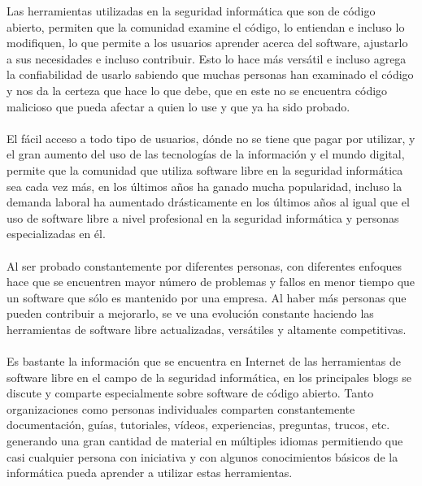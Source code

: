 \begin{multicols}{2}
Las herramientas utilizadas en la seguridad informática que son de código abierto, permiten que la comunidad examine el código, lo entiendan e incluso lo modifiquen, lo que permite a los usuarios aprender acerca del software, ajustarlo a sus necesidades e incluso contribuir. Esto lo hace más versátil e incluso agrega la confiabilidad de usarlo sabiendo que muchas personas han examinado el código y nos da la certeza que hace lo que debe, que en este no se encuentra código malicioso que pueda afectar a quien lo use y que ya ha sido probado.
\\
\\
El fácil acceso a todo tipo de usuarios, dónde no se tiene que pagar por utilizar, y el gran aumento del uso de las tecnologías de la información y el mundo digital, permite que la comunidad que utiliza software libre en la seguridad informática sea cada vez más, en los últimos años ha ganado mucha popularidad, incluso la demanda laboral ha aumentado drásticamente en los últimos años al igual que el uso de software libre a nivel profesional en la seguridad informática y personas especializadas en él.
\\
\\
Al ser probado constantemente por diferentes personas, con diferentes enfoques hace que se encuentren mayor número de problemas y fallos en menor tiempo que un software que sólo es mantenido por una empresa. Al haber más personas que pueden contribuir a mejorarlo, se ve una evolución constante haciendo las herramientas de software libre actualizadas, versátiles y altamente competitivas.
\\
\\
Es bastante la información que se encuentra en Internet de las herramientas de software libre en el campo de la seguridad informática, en los principales blogs se discute y comparte especialmente sobre software de código abierto. Tanto organizaciones como personas individuales comparten constantemente documentación, guías, tutoriales, vídeos, experiencias, preguntas, trucos, etc. generando una gran cantidad de material en múltiples idiomas permitiendo que casi cualquier persona con iniciativa y con algunos conocimientos básicos de la informática pueda aprender a utilizar estas herramientas.\\




\end{multicols}
